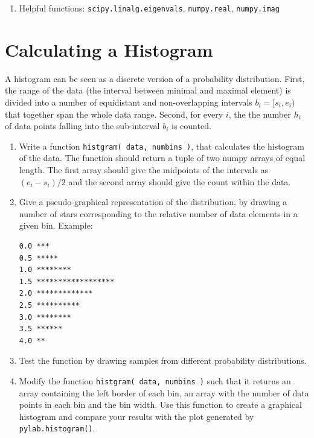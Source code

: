 \documentclass[smallheadings,12pt]{scrartcl}
\begin{document}
\begin{enumerate}
\begin{figure}[H]
\end{figure}

\item[] Helpful functions: {\tt scipy.linalg.eigenvals}, {\tt numpy.real}, {\tt numpy.imag}
\end{enumerate}

\section*{Calculating a Histogram}

A histogram can be seen as a discrete version of a probability
distribution. First, the range of the data (the interval between
minimal and maximal element) is divided into a number of equidistant
and non-overlapping intervals $b_i=[s_i,e_i)$ that together span the whole data
range. Second, for every $i$, the the number $h_i$ of data points falling into
the sub-interval $b_i$ is counted.

\begin{enumerate}
\item Write a function {\tt histgram( data, numbins )}, that calculates the
  histogram of the data. The function should return a tuple of two
  numpy arrays of equal length. The first array should give the midpoints of
  the intervals as $(e_i-s_i)/2$ and the second array should give the
  count within the data. 
\item Give a pseudo-graphical representation of the distribution, by
  drawing a number of stars corresponding to the relative number of
  data elements in a given bin. Example:
\begin{verbatim}
0.0 ***
0.5 *****
1.0 ********
1.5 ******************
2.0 *************
2.5 **********
3.0 ********
3.5 ******
4.0 **
\end{verbatim}
\item Test the function by drawing samples from different probability
  distributions. 
\item Modify the function  {\tt histgram( data, numbins )} such that it 
returns an array containing the left border of each bin, an array with the number of data points in each bin 
and the bin width. Use this function to create a graphical histogram and compare your results with the plot 
generated by {\tt pylab.histogram()}.
\end{enumerate}
\end{document}
